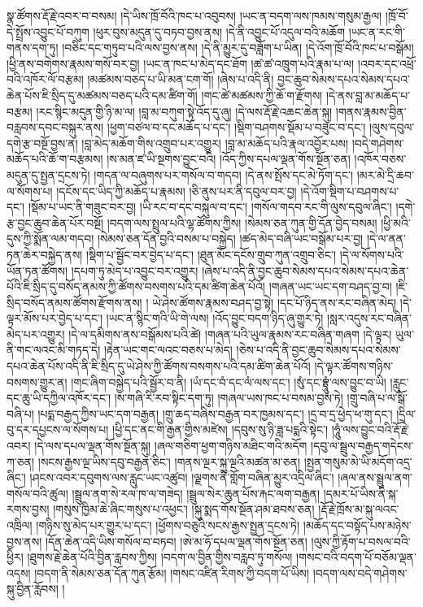 སྣ་ཚོགས་རྡོ་རྗེ་འབར་བ་བསམ། །དེ་ཡིས་ཁྲོ་བོའི་ཁང་པ་འབུབས། །ཡང་ན་བདག་ལས་ཁམས་གསུམ་རྒྱལ། །ཁྲོ་བོ་དེ་སྤྲོས་འབྱུང་པོ་བཀུག །ཕུར་བུས་མདུན་དུ་བཏབ་བྱས་ནས། །དེ་ནི་འབྱུང་པོ་འདུལ་བའི་མཆོག །ཡང་ན་རང་གི་གནས་དག་ཏུ། །བཅིང་དང་གཏུབ་པའི་ལས་བྱས་ནས། །དེ་ནི་མྱུར་དུ་བཟློག་པ་ཡིན། །དེ་འོག་ཁྲོ་བོའི་ཁང་པ་བསྒོམ། །ཕྱི་ནས་བགེགས་རྣམས་གསོ་བར་བྱ། །ཡང་ན་ཁང་པ་མེད་དང་ཐོག །ཚ་ཚ་འཁྲུག་པའི་རྣམ་པ་ལ། །འབར་དང་འཕྲོ་བའི་འཁོར་ལོ་བརྩམ། །མཚམས་བཅད་པ་ཡི་མན་ངག་གོ། །ཞེས་པ་འདི་ནི། བྱང་ཆུབ་སེམས་དཔའ་སེམས་དཔའ་ཆེན་པོས་ཇི་སྲིད་དུ་མཚམས་བཅད་པའི་དམ་ཚིག་གོ། །གང་ཚེ་མཚམས་ཀྱི་ཆོ་ག་རྫོགས། །དེ་ནས་བླ་མ་མཆོད་པ་བརྩམ། །རང་སྙིང་མདུན་གྱི་ཉི་མ་ལ། །བླ་མ་བཀུག་སྟེ་འོད་དུ་ཞུ། །དེ་ལས་རྡོ་རྗེ་འཆང་ཆེན་སྐུ། །གནས་རྣམས་བྱིན་བརླབས་དབང་བསྐུར་ནས། །ཕྱག་བཙལ་བ་དང་མཆོད་པ་དང་། །སྡིག་བཤགས་སྡོམ་པ་བཟུང་བ་དང་། །ལུས་དབུལ་དགེ་རྩ་བསྔོ་བྱས་ན། །བླ་མེད་མཆོག་གིས་འགྲུབ་པར་འགྱུར། །བླ་མ་མཆོད་པའི་རྣལ་འབྱོར་པས། །བདེ་གཤེགས་མཆོད་པའི་ཆོ་ག་བརྩམས། །ས་མན་ཛ་ཡི་སྔགས་བྱུང་བའི། །འོད་ཀྱིས་དཔལ་ལྡན་གོས་སྔོན་ཅན། །འཁོར་བཅས་མདུན་དུ་སྤྱན་དྲངས་ཏེ། །གདན་ལ་བཞུགས་པར་གསོལ་བ་གདབ། །དེ་ནས་སྤོས་དང་མེ་ཏོག་དང་། །མར་མེ་དྲི་ཆབ་ལ་སོགས་པ། །དངོས་དང་ཡིད་ཀྱི་མཆོད་པ་རྣམས། །ཅི་ནུས་པར་ནི་དབུལ་བར་བྱ། །དེ་འོག་སྡིག་པ་བཤགས་པ་དང་། །སྡོམ་པ་ཡང་ནི་གཟུང་བར་བྱ། །ཡི་རང་བ་དང་བསྐུལ་བ་དང་། །གསོལ་གདབ་རང་གི་ལུས་དབུལ་ཞིང་། །དགེ་རྩ་བྱང་ཆུབ་ཆེན་པོར་བསྔོ། །བདག་ལས་སྤྲུལ་པའི་ལྷ་ཚོགས་ཀྱིས། །སེམས་ཅན་ཀུན་གྱི་དོན་བྱེད་བསམ། །ཕྱི་མའི་དུས་ཀྱི་སྨོན་ལམ་གདབ། །སེམས་ཅན་དོན་བྱའི་བསམ་པ་བསྐྱེད། །ཚད་མེད་བཞི་ཡང་བསྒོམ་པར་བྱ། །དེ་ལ་ནན་ཏན་ཆེར་བསྐྱེད་ནས། །སྡིག་པ་སྦྱོང་བར་བྱེད་པ་དང་། །ཐུན་མོང་དངོས་གྲུབ་ཀུན་འགྲུབ་ཅིང་། །དེ་ལ་སོགས་པའི་ཡོན་ཏན་ཚོགས། །དཔག་ཏུ་མེད་པ་འབྱུང་བར་འགྱུར། །ཞེས་པ་འདི་ནི་བྱང་ཆུབ་སེམས་དཔའ་སེམས་དཔའ་ཆེན་པོའི་ཇི་སྲིད་དུ་བསོད་ནམས་ཀྱི་ཚོགས་བསགས་པའི་དམ་ཚིག་ཆེན་པོའོ། །གཞན་ཡང་ཡང་དག་བཤད་བྱ་བ། །ཇི་སྲིད་བསོད་ནམས་ཚོགས་རྫོགས་ནས། །
ཡེ་ཤེས་ཚོགས་རྣམས་བཤད་བྱ་སྟེ། །དང་པོ་ཉིད་ནས་རང་བཞིན་མེད། །དེ་ལྟར་མོས་པར་བྱེད་པ་དང་། །ཡང་ན་སྙིང་གའི་ཡི་གེ་ལས། །འོད་བྱུང་བདག་ཉིད་ཞུ་གྱུར་ཏེ། །སླར་འདུས་རང་བཞིན་མེད་པར་འགྱུར། །དེ་ལ་དམིགས་ནས་བསྒོམས་པའི་ཚེ། །གཞན་པའི་ཡུལ་རྣམས་རང་བཞིན་གཞག །དེ་ལྟར། ཡུལ་ནི་གང་ལའང་མི་གཏད་དེ། །རྟེན་ཡང་གང་ལའང་བཅས་པ་མེད། །ཅེས་པ་འདི་ནི་བྱང་ཆུབ་སེམས་དཔའ་སེམས་དཔའ་ཆེན་པོས་འདི་ནི་ཇི་སྲིད་དུ་ཡེ་ཤེས་ཀྱི་ཚོགས་བསགས་པའི་དམ་ཚིག་ཆེན་པོའོ། །དེ་ལྟར་ཚོགས་གཉིས་བསགས་གྱུར་ན། །གང་ཞིག་བསྐྱེད་པའི་སྦྱོར་བ་ནི། །ཡཾ་དང་བཾ་དང་ལཾ་ལས་དང་། །སུཾ་དང་བྷྲཱུཾ་ལས་བྱུང་བ་ཡི། །རླུང་དང་ཆུ་ཡི་དཀྱིལ་འཁོར་དང་། །ས་གཞི་རི་རབ་སྟིང་དག་ཏུ། །གཞལ་ཡས་ཁང་པ་བསམ་བྱས་ཏེ། །གྲུ་བཞི་པ་ལ་སྒོ་བཞི་པ། །པདྨ་བརྒྱད་ཀྱིས་ཡང་དག་བརྒྱན། །གྲུ་ཆད་བཞིས་བརྒྱན་བར་ཁྱམས་དང་། །དྲ་བ་དྲ་ཕྱེད་ཕ་གུ་དང་། །དྲིལ་བུ་དར་དཔྱངས་ལ་སོགས་པ། །ཕྱི་དང་ནང་གི་རྒྱན་གྱིས་མཛེས། །དབུས་སུ་ཉི་ཟླ་པདྨའི་སྟེང་། །ཧཱུཾ་ལས་བྱུང་བའི་རྡོ་རྗེ་འབར། །དེ་ལས་དཔལ་ལྡན་གོས་སྔོན་སྐུ། །ཞལ་གཅིག་ཕྱག་གཉིས་མཐིང་གའི་མདོག །དབུ་ལ་སྦྲུལ་བརྒྱད་གདེངས་ཀ་ཅན། །སངས་རྒྱས་ལྔ་ཡིས་དབུ་བརྒྱན་ཅིང་། །གནས་ལྔར་སྐུ་ལྔའི་མཚན་མ་ཅན། །སྤྱན་གསུམ་མེ་ཡི་མདོག་འདྲ་ཞིང་། །ཤངས་འབར་དབུགས་ལས་རླུང་ཡང་འཚུབ། །ལྗགས་ནི་གློག་བཞིན་མྱུར་འདྲིལ་ཞིང་། །ཞལ་ནས་སྦྲུལ་ནག་གསོལ་བའི་ཚུལ། །སྦྲུལ་ནག་སེ་རལ་ཁ་ལ་གཟེད། །སྦྲུལ་སེར་ཆུན་པོས་རྐང་ལག་བརྒྱན། །དམར་པོ་ཡིས་ནི་སྐ་རགས་བྱས། །གསུས་ཁྱིམ་ཆེ་ཞིང་གསུས་པ་འཕྱང་། །སྐུ་སྨད་གོས་སྔོན་ཤམ་ཐབས་ཅན། །རྡོ་རྗེ་ཁྲོས་མ་སྐུ་ལའང་འཁྲིལ། །གཉིས་སུ་མེད་པར་གྱུར་པ་དང་། །ཕྱོགས་བཅུའི་སངས་རྒྱས་སྤྱན་དྲངས་ཏེ། །མཆོད་དང་བསྟོད་པས་མཉེས་བྱས་ནས། །དོན་ཆེན་འདི་ཡིས་གསོལ་བ་བཏབ། །ཨེ་མ་ཧོ་དཔལ་ལྡན་གོས་སྔོན་ཅན། །ལུས་ཀྱི་རྟོག་པ་བསལ་བའི་ཕྱིར། །ཐུགས་རྗེ་ཆེན་པོའི་བྱིན་རླབས་ཀྱིས། །བདག་ལ་བྱིན་གྱིས་བརླབ་ཏུ་གསོལ། །གསང་བའི་བདག་པོ་བཅོམ་ལྡན་འདས། །བདག་ནི་སེམས་ཅན་དོན་ཀུན་རྩོམ། །གསང་འཛིན་རིགས་ཀྱི་བདག་པོ་ཡིས། །བདག་ལས་བདེ་གཤེགས་སྐུ་བྱིན་རློབས། །
